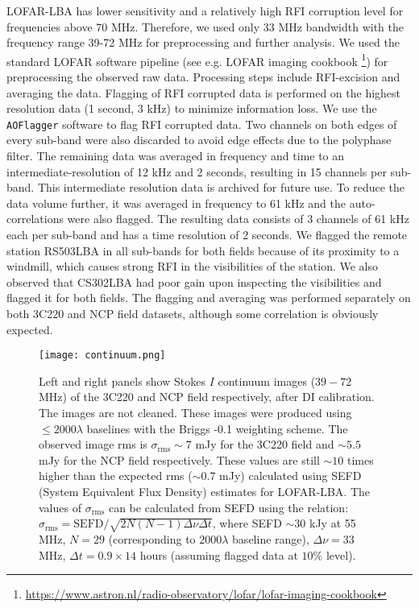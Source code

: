 \documentclass[fleqn,usenatbib]{mnras}
\begin{document}
LOFAR-LBA has lower sensitivity and a relatively high RFI corruption level for frequencies above 70 MHz. Therefore, we used only 33 MHz bandwidth with the frequency range 39-72 MHz for preprocessing and further analysis. We used the standard LOFAR software pipeline (see e.g. LOFAR imaging cookbook \footnote{\url{https://www.astron.nl/radio-observatory/lofar/lofar-imaging-cookbook}}) for preprocessing the observed raw data. Processing steps include RFI-excision and averaging the data. Flagging of RFI corrupted data is performed on the highest resolution data (1 second, 3 kHz) to minimize information loss. We use the \texttt{AOFlagger} software \citep{offringa2010,offringa2012} to flag RFI corrupted data. Two channels on both edges of every sub-band were also discarded to avoid edge effects due to the polyphase filter. The remaining data was averaged in frequency and time to an intermediate-resolution of 12 kHz and 2 seconds, resulting in 15 channels per sub-band. This intermediate resolution data is archived for future use. To reduce the data volume further, it was averaged in frequency to 61 kHz and the auto-correlations were also flagged. The resulting data consists of 3 channels of 61 kHz each per sub-band and has a time resolution of 2 seconds. We flagged the remote station RS503LBA in all sub-bands for both fields because of its proximity to a windmill, which causes strong RFI in the visibilities of the station. We also observed that CS302LBA had poor gain upon inspecting the visibilities and flagged it for both fields. The flagging and averaging was performed separately on both 3C220 and NCP field datasets, although some correlation is obviously expected. 

\begin{figure*}
\centering
\texttt{[image: continuum.png]}
    \caption{Left and right panels show Stokes $I$ continuum images ($39-72$ MHz) of the 3C220 and NCP field respectively, after DI calibration. The images are not cleaned. These images were produced using $\leq2000\lambda$ baselines with the Briggs -0.1 weighting scheme. The observed image rms is $\sigma_{\text{rms}}\sim 7$ mJy for the 3C220 field and $\sim 5.5$ mJy for the NCP field respectively. These values are still $\sim 10$ times higher than the expected rms ($\sim 0.7$ mJy) calculated using SEFD (System Equivalent Flux Density) estimates for LOFAR-LBA. The values of $\sigma_{\text{rms}}$ can be calculated from SEFD using the relation: $\sigma_{\text{rms}} =  \text{SEFD}/\sqrt{2N(N-1)\Delta \nu \Delta t}$, where SEFD  $\sim 30$ kJy at 55 MHz, $N = 29$ (corresponding to $2000\lambda$ baseline range), $\Delta\nu = 33$ MHz, $\Delta t = 0.9\times 14$ hours (assuming flagged data at $10\%$ level).} 
\label{fig:continuum}
\end{figure*} 
\end{document}
